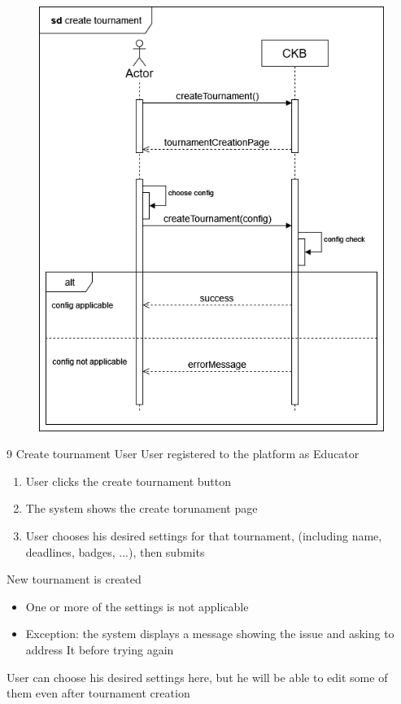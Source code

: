 \usecase
{
    \begin{figure}[H]
        \centering
        \includegraphics[width=\textwidth]{src/sd_diagrams/createtourn.png}
    \end{figure}
}
{9}
{Create tournament} %
{User} %
{User registered to the platform as Educator} %
{ %
    \begin{enumerate}
        \item User clicks the create tournament button
        \item The system shows the create torunament page
        \item User chooses his desired settings for that tournament, (including name, deadlines, badges, ...), then submits
    \end{enumerate}
}
{New tournament is created} %
{ %
    \begin{itemize}
        \item One or more of the settings is not applicable
    \end{itemize}
}
{ %
    \begin{itemize}
        \item Exception: the system displays a message showing the issue and asking to address It before trying again
    \end{itemize}
    User can choose his desired settings here, but he will be able to edit some of them even after tournament creation
}

